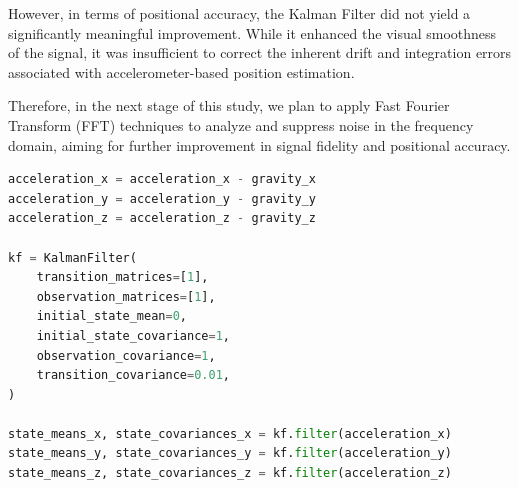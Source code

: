 \documentclass{article}
\begin{document}
    However, in terms of positional accuracy, the Kalman Filter did not yield a
    significantly meaningful improvement. While it enhanced the visual smoothness
    of the signal, it was insufficient to correct the inherent drift and
    integration errors associated with accelerometer-based position estimation.

    Therefore, in the next stage of this study, we plan to apply Fast Fourier
    Transform (FFT) techniques to analyze and suppress noise in the frequency
    domain, aiming for further improvement in signal fidelity and positional accuracy.

    \begin{lstlisting}[language=Python, caption={Kalman Filter for noise reduction}, label={lst:kalman_filter}]
acceleration_x = acceleration_x - gravity_x
acceleration_y = acceleration_y - gravity_y
acceleration_z = acceleration_z - gravity_z

kf = KalmanFilter(
    transition_matrices=[1],
    observation_matrices=[1],
    initial_state_mean=0,
    initial_state_covariance=1,
    observation_covariance=1,
    transition_covariance=0.01,
)

state_means_x, state_covariances_x = kf.filter(acceleration_x)
state_means_y, state_covariances_y = kf.filter(acceleration_y)
state_means_z, state_covariances_z = kf.filter(acceleration_z)
\end{lstlisting}
\end{document}
